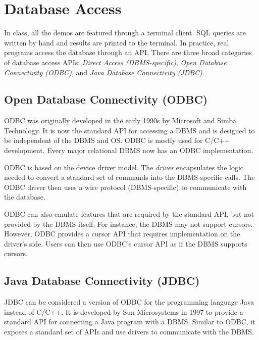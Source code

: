 \documentclass[11pt]{article}
\begin{document}
\maketitle
\thispagestyle{plain}

\section{Database Access}
In class, all the demos are featured through a terminal client. SQL queries are written by hand and 
results are printed to the terminal. In practice, real programs access the database through an API. 
There are three broad categories of database access APIs: \textit{Direct Access (DBMS-specific)}, 
\textit{Open Database Connectivity (ODBC)}, and \textit{Java Database Connectivity (JDBC)}.

\subsection*{Open Database Connectivity (ODBC)}
ODBC was originally developed in the early 1990s by Microsoft and Simba Technology. It is now the 
standard API for accessing a DBMS and is designed to be independent of the DBMS and OS. ODBC is 
mostly used for C/C++ development. Every major relational DBMS now has an ODBC implementation.

ODBC is based on the device driver model. The \textit{driver} encapsulates the logic needed to 
convert a standard set of commands into the DBMS-specific calls. The ODBC driver then uses a wire 
protocol (DBMS-specific) to communicate with the database.

ODBC can also emulate features that are required by the standard API, but not provided by the DBMS 
itself. For instance, the DBMS may not support cursors. However, ODBC provides a cursor API that 
requires implementation on the driver's side. Users can then use ODBC's cursor API as if the DBMS 
supports cursors.

\subsection*{Java Database Connectivity (JDBC)}
JDBC can be considered a version of ODBC for the programming language Java instead of C/C++. It is 
developed by Sun Microsystems in 1997 to provide a standard API for connecting a Java program with a 
DBMS. Similar to ODBC, it exposes a standard set of APIs and use drivers to communicate with the 
DBMS. 
\end{document}
